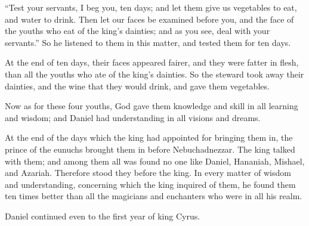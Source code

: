 {“Test your servants, I beg you, ten days; and let them give us vegetables to eat, and water to drink.
Then let our faces be examined before you, and the face of the youths who eat of the king’s dainties; and as you see, deal with your servants.”
So he listened to them in this matter, and tested them for ten days.
\par }{\PP {}At the end of ten days, their faces appeared fairer, and they were fatter in flesh, than all the youths who ate of the king’s dainties.
So the steward took away their dainties, and the wine that they would drink, and gave them vegetables.
\par }{\PP {}Now as for these four youths, God gave them knowledge and skill in all learning and wisdom; and Daniel had understanding in all visions and dreams.
\par }{\PP {}At the end of the days which the king had appointed for bringing them in, the prince of the eunuchs brought them in before Nebuchadnezzar.
The king talked with them; and among them all was found no one like Daniel, Hananiah, Mishael, and Azariah. Therefore stood they before the king.
In every matter of wisdom and understanding, concerning which the king inquired of them, he found them ten times better than all the magicians and enchanters who were in all his realm.
\par }{\PP {}Daniel continued even to the first year of king Cyrus.

}
